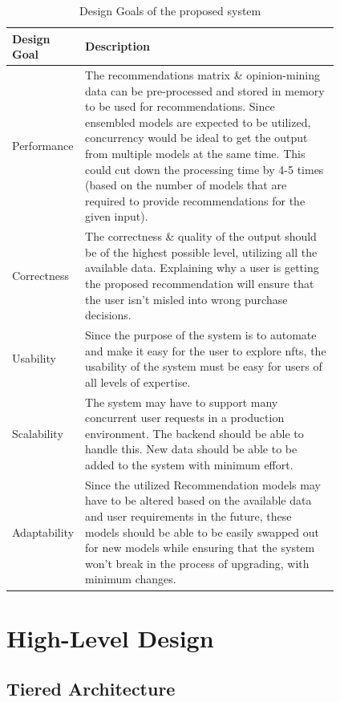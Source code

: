 \begin{table}[h!]
\caption{Design Goals of the proposed system}
{ 
\begin{tabular}{|l|p{0.81\linewidth}|}
\hline
\textbf{Design Goal} & \textbf{Description}\\
\hline
Performance & The recommendations matrix \& opinion-mining data can be pre-processed and stored in memory to be used for recommendations. Since ensembled models are expected to be utilized, concurrency would be ideal to get the output from multiple models at the same time. This could cut down the processing time by 4-5 times (based on the number of models that are required to provide recommendations for the given input). \\ 
\hline
Correctness & The correctness \& quality of the output should be of the highest possible level, utilizing all the available data. Explaining why a user is getting the proposed recommendation will ensure that the user isn't misled into wrong purchase decisions. \\ 
\hline
Usability & Since the purpose of the system is to automate and make it easy for the user to explore \gls{nft}s, the usability of the system must be easy for users of all levels of expertise. \\ 
\hline
Scalability & The system may have to support many concurrent user requests in a production environment. The backend should be able to handle this. New data should be able to be added to the system with minimum effort. \\
\hline
Adaptability & Since the utilized Recommendation models may have to be altered based on the available data and user requirements in the future, these models should be able to be easily swapped out for new models while ensuring that the system won't break in the process of upgrading, with minimum changes. \\
\hline
\end{tabular}
}
\end{table}

\section{High-Level Design}


\subsection{Tiered Architecture}

